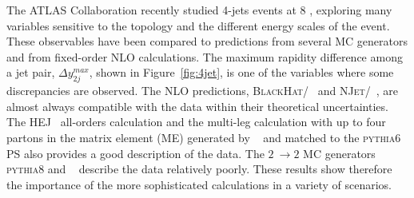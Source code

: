 \documentclass{PoS}
\providecommand{\NJET} {{\textsc{NJet}}\xspace}
\providecommand{\BLACKHAT} {{\textsc{BlackHat}}\xspace}
\providecommand{\HEJ} {{\textsc{HEJ}}\xspace}
\providecommand{\PYTHIAS} {{\textsc{pythia6}}\xspace}
\providecommand{\PYTHIAE} {{\textsc{pythia8}}\xspace}
\begin{document}
The ATLAS Collaboration recently studied 4-jets events at 8 \TeV\cite{Aad:2015nda}, exploring many variables sensitive to the topology and the
different energy scales of the event. These observables have been compared to predictions from several MC
generators and from fixed-order NLO calculations. The maximum rapidity difference among a jet pair, $\Delta
y_{2j}^{max}$, shown in Figure~\ref{fig:4jet}, is one of the variables where some discrepancies are observed. 
The NLO predictions, \BLACKHAT/\SHERPA~\cite{Berger:2008sj,Bern:2011ep} and
\NJET/\SHERPA~\cite{Badger:2012pg,Badger:2012pf}, are almost always compatible with the data within their 
theoretical uncertainties. The \HEJ~\cite{Andersen:2009nu,Andersen:2011hs} all-orders calculation and the multi-leg calculation with up to four partons in the
matrix element (ME) generated by \MADGRAPH~\cite{Alwall:2014hca} and matched to the \PYTHIAS~\cite{Sjostrand:2006za} PS also provides a good description of
the data. The $2\ \to 2$ MC generators \PYTHIAE and \HERWIGpp~\cite{Bahr:2008pv}
 describe the data relatively poorly. These results show therefore 
the importance of the more sophisticated calculations in a variety of scenarios. 
\end{document}
